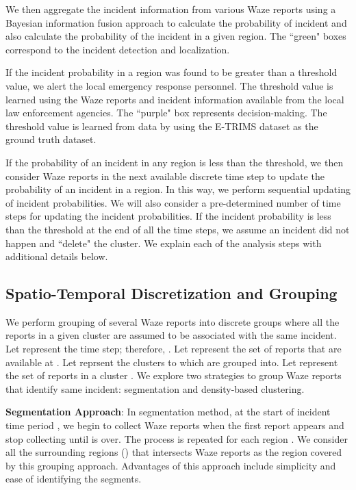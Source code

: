 \documentclass[conference]{IEEEtran}
\begin{document}
We then aggregate the incident information from various Waze reports using a Bayesian information fusion approach to calculate the probability of incident and also calculate the probability of the incident in a given region. The ``green" boxes correspond to the incident detection and localization.

If the incident probability in a region was found to be greater than a threshold value, we alert the local emergency response personnel. The threshold value is learned using the Waze reports and incident information available from the local law enforcement agencies. The ``purple" box represents decision-making. The threshold value is learned from data by using the E-TRIMS dataset as the ground truth dataset.

If the probability of an incident in any region is less than the threshold, we then consider Waze reports in the next available discrete time step to update the probability of an incident in a region. In this way, we perform sequential updating of incident probabilities. We will also consider a pre-determined number of time steps for updating the incident probabilities. If the incident probability is less than the threshold at the end of all the time steps, we assume an incident did not happen and ``delete" the cluster.  We explain each of the analysis steps with additional details below.











\subsection{Spatio-Temporal Discretization and Grouping}
\label{subsec:grouping}

We perform grouping of several Waze reports into discrete groups where all the reports in a given cluster are assumed to be associated with the same incident. Let  represent the  time step; therefore, . Let  represent the set of reports that are available at . Let  reprsent the  clusters to which  are grouped into. Let  represent the set of  reports in a cluster . 
We explore two strategies to group Waze reports that identify same incident: segmentation and density-based clustering.

\textbf{Segmentation Approach}: In segmentation method, at the start of incident time period , we begin to collect Waze reports when the first report appears and stop collecting until  is over. The process is repeated for each region . We consider all the surrounding regions () that intersects Waze reports as the region covered by this grouping approach. 
Advantages of this approach include simplicity and ease of identifying the segments. 
\end{document}
